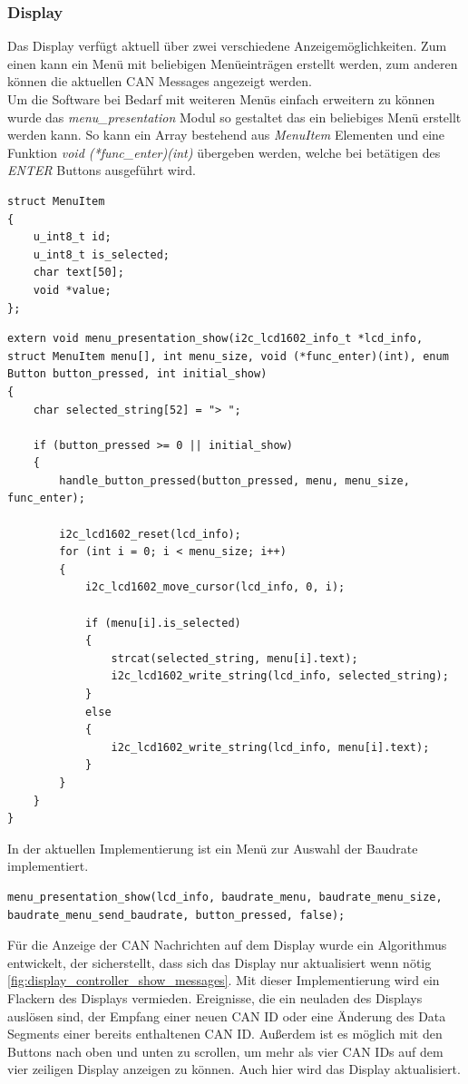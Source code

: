 \subsubsection{Display}
Das Display verfügt aktuell über zwei verschiedene Anzeigemöglichkeiten. Zum einen kann ein Menü mit beliebigen Menüeinträgen erstellt werden, zum anderen können die aktuellen CAN Messages angezeigt werden. \\
Um die Software bei Bedarf mit weiteren Menüs einfach erweitern zu können wurde das \textit{menu\_presentation} Modul so gestaltet das ein beliebiges Menü erstellt werden kann. So kann ein Array bestehend aus \textit{MenuItem} Elementen und eine Funktion \textit{void (*func\_enter)(int)} übergeben werden, welche bei betätigen des \textit{ENTER} Buttons ausgeführt wird.
\begin{lstlisting}
struct MenuItem
{
    u_int8_t id;
    u_int8_t is_selected;
    char text[50];
    void *value;
};
\end{lstlisting}
\begin{lstlisting}
extern void menu_presentation_show(i2c_lcd1602_info_t *lcd_info, struct MenuItem menu[], int menu_size, void (*func_enter)(int), enum Button button_pressed, int initial_show)
{
    char selected_string[52] = "> ";

    if (button_pressed >= 0 || initial_show)
    {
        handle_button_pressed(button_pressed, menu, menu_size, func_enter);

        i2c_lcd1602_reset(lcd_info);
        for (int i = 0; i < menu_size; i++)
        {
            i2c_lcd1602_move_cursor(lcd_info, 0, i);

            if (menu[i].is_selected)
            {
                strcat(selected_string, menu[i].text);
                i2c_lcd1602_write_string(lcd_info, selected_string);
            }
            else
            {
                i2c_lcd1602_write_string(lcd_info, menu[i].text);
            }
        }
    }
}
\end{lstlisting}
In der aktuellen Implementierung ist ein Menü zur Auswahl der Baudrate implementiert.
\begin{lstlisting}
menu_presentation_show(lcd_info, baudrate_menu, baudrate_menu_size, baudrate_menu_send_baudrate, button_pressed, false);
\end{lstlisting}
Für die Anzeige der CAN Nachrichten auf dem Display wurde ein Algorithmus entwickelt, der sicherstellt, dass sich das Display nur aktualisiert wenn nötig \ref{fig:display_controller_show_messages}. Mit dieser Implementierung wird ein Flackern des Displays vermieden. Ereignisse, die ein neuladen des Displays auslösen sind, der Empfang einer neuen CAN ID oder eine Änderung des Data Segments einer bereits enthaltenen CAN ID. Außerdem ist es möglich mit den Buttons nach oben und unten zu scrollen, um mehr als vier CAN IDs auf dem vier zeiligen Display anzeigen zu können. Auch hier wird das Display aktualisiert.
